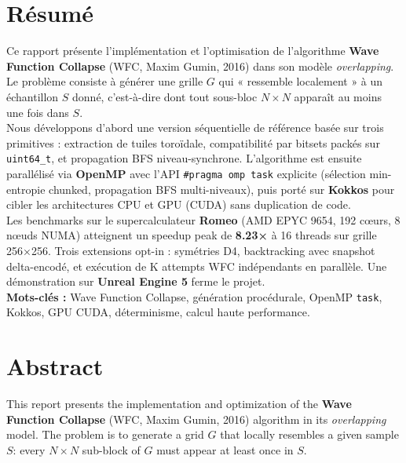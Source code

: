 \documentclass[a4paper,12pt]{report}
\begin{document}
\chapter*{Résumé}

Ce rapport présente l'implémentation et l'optimisation de l'algorithme \textbf{Wave Function Collapse} (WFC, Maxim Gumin, 2016) dans son modèle \textit{overlapping}. Le problème consiste à générer une grille $G$ qui « ressemble localement » à un échantillon $S$ donné, c'est-à-dire dont tout sous-bloc $N \times N$ apparaît au moins une fois dans $S$. \\

Nous développons d'abord une version séquentielle de référence basée sur trois primitives : extraction de tuiles toroïdale, compatibilité par bitsets packés sur \texttt{uint64\_t}, et propagation BFS niveau-synchrone. L'algorithme est ensuite parallélisé via \textbf{OpenMP} avec l'API \texttt{\#pragma omp task} explicite (sélection min-entropie chunked, propagation BFS multi-niveaux), puis porté sur \textbf{Kokkos} pour cibler les architectures CPU et GPU (CUDA) sans duplication de code. \\

Les benchmarks sur le supercalculateur \textbf{Romeo} (AMD EPYC 9654, 192 cœurs, 8 nœuds NUMA) atteignent un speedup peak de \textbf{8.23×} à 16 threads sur grille 256×256. Trois extensions opt-in : symétries D4, backtracking avec snapshot delta-encodé, et exécution de K attempts WFC indépendants en parallèle. Une démonstration sur \textbf{Unreal Engine 5} ferme le projet. \\

\textbf{Mots-clés :} Wave Function Collapse, génération procédurale, OpenMP \texttt{task}, Kokkos, GPU CUDA, déterminisme, calcul haute performance. \\

\chapter*{Abstract}

This report presents the implementation and optimization of the \textbf{Wave Function Collapse} (WFC, Maxim Gumin, 2016) algorithm in its \textit{overlapping} model. The problem is to generate a grid $G$ that locally resembles a given sample $S$: every $N \times N$ sub-block of $G$ must appear at least once in $S$. \\
\end{document}
